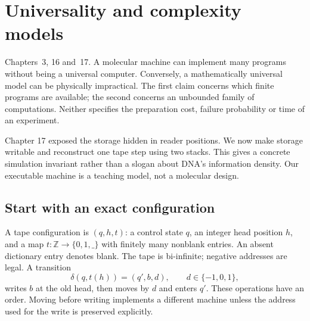 \chapter{Universality and complexity models}
{Chapters~3, 16 and~17.}
A molecular machine can implement many programs without being a universal
computer. Conversely, a mathematically universal model can be physically
impractical. The first claim concerns which finite programs are available;
the second concerns an unbounded family of computations. Neither specifies
the preparation cost, failure probability or time of an experiment.

Chapter 17 exposed the storage hidden in reader positions. We now make
storage writable and reconstruct one tape step using two stacks. This gives
a concrete simulation invariant rather than a slogan about DNA's information
density. Our executable machine is a teaching model, not a molecular design.

\section{Start with an exact configuration}
A tape configuration is $(q,h,t)$: a control state $q$, an integer head
position $h$, and a map $t:\mathbb Z\to\{0,1,\_\}$ with finitely many
nonblank entries. An absent dictionary entry denotes blank. The tape is
bi-infinite; negative addresses are legal. A transition
\begin{equation}
 \delta(q,t(h))=(q',b,d),\qquad d\in\{-1,0,1\},
\end{equation}
writes $b$ at the old head, then moves by $d$ and enters $q'$. These
operations have an order. Moving before writing implements a different
machine unless the address used for the write is preserved explicitly.


